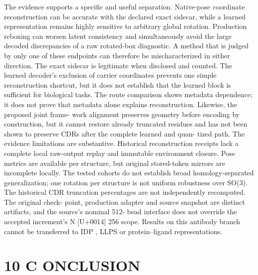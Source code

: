 \documentclass[11pt]{article}
\begin{document}
The evidence supports a specific and useful separation. Native-pose coordinate reconstruction can
be accurate with the declared exact sidecar, while a learned representation remains highly sensitive
to arbitrary global rotation. Production reboxing can worsen latent consistency and simultaneously
avoid the large decoded discrepancies of a raw rotated-box diagnostic. A method that is judged by
only one of these endpoints can therefore be mischaracterized in either direction.
The exact sidecar is legitimate when disclosed and counted. The learned decoder’s exclusion of
carrier coordinates prevents one simple reconstruction shortcut, but it does not establish that the
learned block is sufficient for biological tasks. The route comparison shows metadata dependence;
it does not prove that metadata alone explains reconstruction. Likewise, the proposed joint frame-
work alignment preserves geometry before encoding by construction, but it cannot restore already
truncated residues and has not been shown to preserve CDRs after the complete learned and quan-
tized path.
The evidence limitations are substantive. Historical reconstruction receipts lack a complete local
raw-output replay and immutable environment closure. Pose metrics are available per structure,
but original stored-token mirrors are incomplete locally. The tested cohorts do not establish broad
homology-separated generalization; one rotation per structure is not uniform robustness over SO(3).
The historical CDR truncation percentages are not independently recomputed. The original check-
point, production adapter and source snapshot are distinct artifacts, and the source’s nominal 512-
bead interface does not override the accepted increment’s N [U+0014] 256 scope. Results on this antibody
branch cannot be transferred to IDP , LLPS or protein–ligand representations.

\section*{10 C ONCLUSION}
\end{document}
